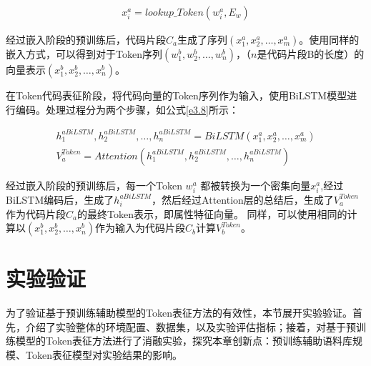 \begin{equation}\label{e3.7}
  \begin{split}
  x_{i}^{a} = lookup\_Token \left(w_{i}^{a} ,E_{w} \right)
  \end{split}
\end{equation}

经过嵌入阶段的预训练后，代码片段$C_{a}$生成了序列$\left( x_{1}^{a},x_{2}^{a},\ldots,x_{m}^{a}\right)$。使用同样的嵌入方式，可以得到对于Token序列$\left( w_{1}^{b},w_{2}^{b},\ldots,w_{n}^{b}\right)$，（$n$是代码片段B的长度）的向量表示$\left( x_{1}^{b},x_{2}^{b},\ldots,x_{n}^{b} \right)$。

在Token代码表征阶段，将代码向量的Token序列作为输入，使用BiLSTM模型进行编码。处理过程分为两个步骤，如公式\ref{e3.8}所示：

\begin{equation}\label{e3.8}
  \begin{split}
    h_{1}^{aBiLSTM},h_{2}^{aBiLSTM},\ldots,h_{n}^{aBiLSTM} = BiLSTM \left(x_{1}^{a},x_{2}^{a},\ldots,x_{m}^{a}\right) \\
    V_{a}^{Token} = Attention \left( h_{1}^{aBiLSTM},h_{2}^{aBiLSTM},\ldots,h_{n}^{aBiLSTM} \right)
  \end{split}
\end{equation}

经过嵌入阶段的预训练后，每一个Token $w_{i}^{a}$ 都被转换为一个密集向量$x_{i}^{a}$,经过BiLSTM编码后，生成了$h_{i}^{aBiLSTM}$，然后经过Attention层的总结后，生成了$V_{a}^{Token}$作为代码片段$C_{a}$的最终Token表示，即属性特征向量。
同样，可以使用相同的计算以$\left( x_{1}^{b},x_{2}^{b},\ldots,x_{n}^{b} \right)$作为输入为代码片段$C_{b}$计算$V_{b}^{Token}$。

\section{实验验证}
\label{sec:TokenExperiment}
为了验证基于预训练辅助模型的Token表征方法的有效性，本节展开实验验证。首先，介绍了实验整体的环境配置、数据集，以及实验评估指标；接着，对基于预训练模型的Token表征方法进行了消融实验，探究本章创新点：预训练辅助语料库规模、Token表征模型对实验结果的影响。

